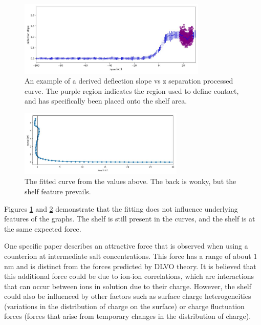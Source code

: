 \begin{figure}[h!]
\centering
\includegraphics[width=0.8\textwidth]{chapter8/Shelf/Targeted df_deriv_bin.jpg}
\caption{An example of a derived deflection slope vs z separation processed curve. The purple region indicates the region used to define contact, and has specifically been placed onto the shelf area.}
\label{fig:Deriv2}
\end{figure}
\begin{figure}[h!]
\centering
\includegraphics[width=0.7\textwidth]{chapter8/Shelf/Targeted approach_force_sep.jpg}
\caption{The fitted curve from the values above. The back is wonky, but the shelf feature prevails.}
\label{fig:CurveBack2}
\end{figure}

Figures \ref{fig:Deriv2} and \ref{fig:CurveBack2} demonstrate that the fitting does not influence underlying features of the graphs. The shelf is still present in the curves, and the shelf is at the same expected force.

One specific paper describes an attractive force that is observed when using a counterion at intermediate salt concentrations. This force has a range of about 1 nm and is distinct from the forces predicted by DLVO theory. It is believed that this additional force could be due to ion-ion correlations, which are interactions that can occur between ions in solution due to their charge. However, the shelf could also be influenced by other factors such as surface charge heterogeneities (variations in the distribution of charge on the surface) or charge fluctuation forces (forces that arise from temporary changes in the distribution of charge). \cite{Valmacco2016}

